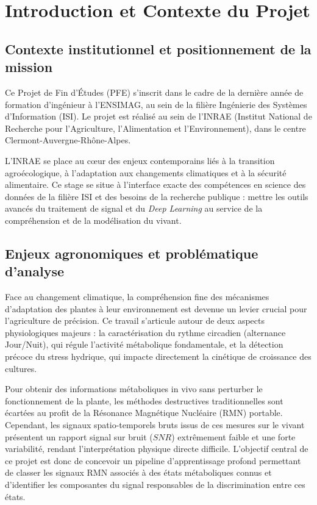 \documentclass[12pt,a4paper,twoside]{article}
\begin{document}
\clearpage

\thispagestyle{plain}
\tableofcontents
\clearpage

\setcounter{page}{1} 

\section{Introduction et Contexte du Projet}
\label{sec:introduction}

\subsection{Contexte institutionnel et positionnement de la mission}
\label{subsec:contexte_institutionnel}

Ce Projet de Fin d'Études (PFE) s'inscrit dans le cadre de la dernière année de formation d'ingénieur à l'ENSIMAG, au sein de la filière Ingénierie des Systèmes d'Information (ISI). Le projet est réalisé au sein de l'INRAE (Institut National de Recherche pour l'Agriculture, l'Alimentation et l'Environnement), dans le centre Clermont-Auvergne-Rhône-Alpes. 

L'INRAE se place au cœur des enjeux contemporains liés à la transition agroécologique, à l'adaptation aux changements climatiques et à la sécurité alimentaire. Ce stage se situe à l'interface exacte des compétences en science des données de la filière ISI et des besoins de la recherche publique : mettre les outils avancés du traitement de signal et du \textit{Deep Learning} au service de la compréhension et de la modélisation du vivant.

\subsection{Enjeux agronomiques et problématique d'analyse}
\label{subsec:enjeux_agronomiques}
Face au changement climatique, la compréhension fine des mécanismes d'adaptation des plantes à leur environnement est devenue un levier crucial pour l'agriculture de précision. Ce travail s'articule autour de deux aspects physiologiques majeurs : la caractérisation du rythme circadien (alternance Jour/Nuit), qui régule l'activité métabolique fondamentale, et la détection précoce du stress hydrique, qui impacte directement la cinétique de croissance des cultures.

Pour obtenir des informations métaboliques in vivo sans perturber le fonctionnement de la plante, les méthodes destructives traditionnelles sont écartées au profit de la Résonance Magnétique Nucléaire (RMN) portable. Cependant, les signaux spatio-temporels bruts issus de ces mesures sur le vivant présentent un rapport signal sur bruit ($SNR$) extrêmement faible et une forte variabilité, rendant l'interprétation physique directe difficile. L'objectif central de ce projet est donc de concevoir un pipeline d'apprentissage profond permettant de classer les signaux RMN associés à des états métaboliques connus et d'identifier les composantes du signal responsables de la discrimination entre ces états.
\end{document}
